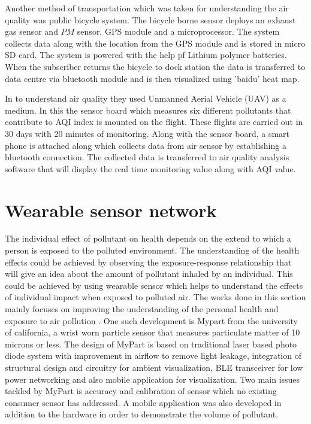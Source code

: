 Another method of transportation which was taken for understanding the air quality was public bicycle system. The bicycle borne sensor \cite{Xiang2016,Liu2015a} deploys an exhaust gas sensor and $PM$ sensor, GPS module and a microprocessor. The system collects data along with the location from the GPS module and is stored in micro SD card. The system is powered with the help pf Lithium polymer batteries. When the subscriber returns the bicycle to dock station the data is transferred to data centre via bluetooth module and is then visualized using 'baidu' heat map. 

In \cite{Zhi2017} to understand air quality they used Unmanned Aerial Vehicle (UAV) as a medium.  In this the sensor board which measures six different pollutants that contribute to AQI index is mounted on the flight.  These flights are carried out in 30 days with 20 minutes of monitoring. Along with the sensor board, a smart phone is attached along which collects data from air sensor by establishing a bluetooth connection. The collected data is transferred to air quality analysis software that will display the real time monitoring value along with AQI value.




\section{Wearable sensor network}


The individual effect of pollutant on health depends on the extend to which a person is exposed to the polluted environment. The understanding of the health effects could be achieved by observing the exposure-response relationship \cite{Dons2017} that will give an idea about the amount of pollutant inhaled by an individual. This could be achieved by using wearable sensor which helps to understand the effects of individual impact when exposed to polluted air. The works done in this section mainly focuses on improving the understanding of the personal health and exposure to air pollution \cite{Hu2015}. One such development is Mypart \cite{Tian2016}  from the university of california, a wrist worn particle sensor that measures particulate matter of 10 microns or less.  The design of MyPart is based on traditional laser based photo diode system with improvement in airflow to remove light leakage, integration of structural design and circuitry for ambient visualization, BLE transceiver for low power networking and also mobile application for visualization. Two main issues tackled by MyPart is accuracy and calibration of sensor which no existing consumer sensor has addressed. A mobile application was also developed in addition to the hardware in order to demonstrate the volume of pollutant.

